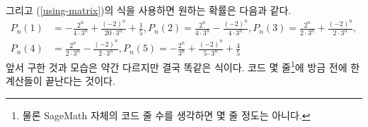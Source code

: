 \documentclass{scrartcl}
\begin{document}
그리고 (\ref{using-matrix})의 식을 사용하면 원하는 확률은 다음과 같다.
\begin{align*}
  P_n(1)&=-\frac{2^{n}}{4 \cdot 3^{n}} + \frac{\left(-2\right)^{n}}{20 \cdot 3^{n}} + \frac{1}{5}, P_n(2)=\frac{2^{n}}{4 \cdot 3^{n}} - \frac{\left(-2\right)^{n}}{4 \cdot 3^{n}}, P_n(3)=\frac{2^{n}}{2 \cdot 3^{n}} + \frac{\left(-2\right)^{n}}{2 \cdot 3^{n}}, \\
  P_n(4)&=\frac{2^{n}}{2 \cdot 3^{n}} - \frac{\left(-2\right)^{n}}{2 \cdot 3^{n}}, P_n(5)=-\frac{2^{n}}{3^{n}} + \frac{\left(-2\right)^{n}}{5 \cdot 3^{n}} + \frac{4}{5}
\end{align*}
앞서 구한 것과 모습은 약간 다르지만 결국 똑같은 식이다. 코드 몇 줄\footnote{물론 SageMath 자체의 코드 줄 수를 생각하면 몇 줄 정도는 아니다.}에 방금 전에 한 계산들이 끝난다는 것이다.
\end{document}
